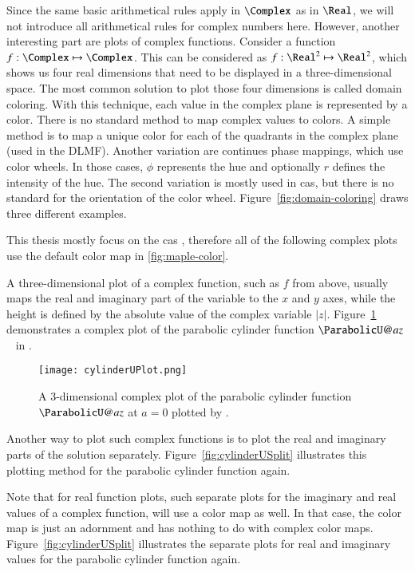 Since the same basic arithmetical rules apply in $\Complex$ as in $\Real$, we will not introduce all arithmetical rules for complex numbers here. However, another interesting part are plots of complex functions. Consider a function $f: \Complex \mapsto \Complex$. This can be considered as $f: \Real^2 \mapsto \Real^2$, which shows us four real dimensions that need to be displayed in a three-dimensional space. The most common solution to plot those four dimensions is called domain coloring. With this technique, each value in the complex plane is represented by a color. There is no standard method to map complex values to colors. A simple method is to map a unique color for each of the quadrants in the complex plane (used in the DLMF). Another variation are continues phase mappings, which use color wheels. In those cases, $\phi$ represents the hue and optionally $r$ defines the intensity of the hue. The second variation is mostly used in \gls{cas}, but there is no standard for the orientation of the color wheel. Figure~\ref{fig:domain-coloring} draws three different examples.

This thesis mostly focus on the \gls{cas} \Maple, therefore all of the following complex plots use the default color map in \Maple{~}\ref{fig:maple-color}.

A three-dimensional plot of a complex function, such as $f$ from above, usually maps the real and imaginary part of the variable to the $x$ and $y$ axes, while the height is defined by the absolute value of the complex variable $|z|$. Figure~\ref{fig:cylinderU} demonstrates a complex plot of the parabolic cylinder function $\ParabolicU@{a}{z}$~\cite[(12.2i)]{NIST:DLMF} in \Maple. 

\begin{figure}[ht]
	\centering
	\texttt{[image: cylinderUPlot.png]}
	\caption{A 3-dimensional complex plot of the parabolic cylinder function $\ParabolicU@{a}{z}$ at $a=0$ plotted by \Maple.~\cite[(12.2i)]{NIST:DLMF}}
	\label{fig:cylinderU}
\end{figure}

Another way to plot such complex functions is to plot the real and imaginary parts of the solution separately. Figure~\ref{fig:cylinderUSplit} illustrates this plotting method for the parabolic cylinder function again. 

Note that for real function plots, such separate plots for the imaginary and real values of a complex function, will use a color map as well. In that case, the color map is just an adornment and has nothing to do with complex color maps. Figure~\ref{fig:cylinderUSplit} illustrates the separate plots for real and imaginary values for the parabolic cylinder function again.

